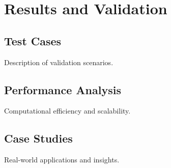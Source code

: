 \section{Results and Validation}
\subsection{Test Cases}
Description of validation scenarios.

\subsection{Performance Analysis}
Computational efficiency and scalability.

\subsection{Case Studies}
Real-world applications and insights. 